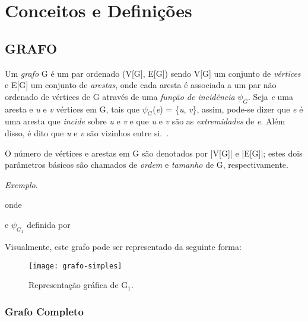 \chapter{Conceitos e Defini{\c   c}{\~o}es}
\label{conceitos}

\section{\texorpdfstring{\MakeUppercase{Grafo}}{}}
\label{conceitos__grafo}

Um \emph{grafo} G é um par ordenado (V[G], E[G]) sendo V[G] um conjunto de \emph{vértices} e E[G] um conjunto de \emph{arestas}, onde cada aresta é associada a um par não ordenado de vértices de G através de uma \emph{função de incidência} $\psi_{G}$. Seja \emph{e} uma aresta e \emph{u} e \emph{v} vértices em G, tais que $\psi_{G}$(\emph{e}) = \{\emph{u}, \emph{v}\}, assim, pode-se dizer que \emph{e} é uma aresta que \emph{incide} sobre \emph{u} e \emph{v} e que \emph{u} e \emph{v} são as \emph{extremidades} de \emph{e}. Além disso, é dito que \emph{u} e \emph{v} são vizinhos entre si.~\cite{bondy1976graph}.

O número de vértices e arestas em G são denotados por |V[G]| e |E[G]|; estes
dois parâmetros básicos são chamados de \emph{ordem} e \emph{tamanho} de G, respectivamente.

\noindent\emph{Exemplo}.


\noindent onde



\noindent e $\psi_{G_{1}}$ definida por



Visualmente, este grafo pode ser representado da seguinte forma:

\begin{figure}[H]
\texttt{[image: grafo-simples]}
\centering
\caption{Representação gráfica de G$_{1}$.}
\end{figure}

\subsection{Grafo Completo}
\label{conceitos__grafo--comleto}

